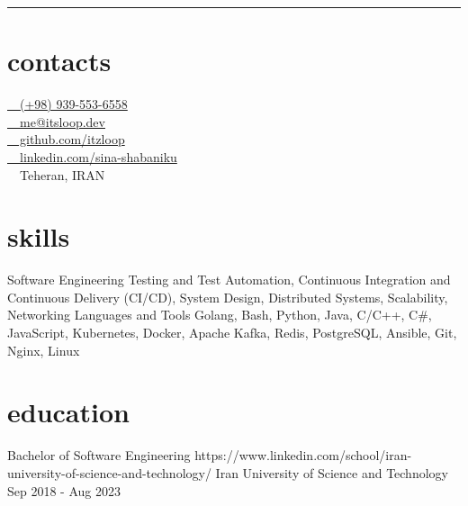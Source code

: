 \documentclass[a4paper,20pt]{article}
\begin{document}
\begin{center}
\end{center}
\vspace*{1pt}
\begin{center}
\end{center}
\rule{\textwidth}{1pt}
\vspace{20pt}
\begin{minipage}[t]{0.3\textwidth}
  \preparetopsec
  \section{contacts}
  {
    \href{tel:989395536558}{ \small~~(+98) 939-553-6558} \\ \vspace{6pt}  
    \href{mailto:me@itsloop.dev}{ \small~~me@itsloop.dev} \\ \vspace{6pt} 
    \href{https://github.com/itzloop}{ \small~~github.com/itzloop}\\ \vspace{6pt} 
    \href{https://linkedin.com/in/sina-shabaniku}{ \small~~linkedin.com/sina-shabaniku} \\ \vspace{6pt} 
     \small~~Teheran, IRAN
    \vspace*{14pt}
  }

  \preparenormalsec
  \section{skills}
  {
    \skill
      {Software Engineering}
      {Testing and Test Automation, Continuous Integration and Continuous Delivery (CI/CD), System Design, Distributed Systems, Scalability, Networking}
    \vspace*{10pt}
    \skill
      {Languages and Tools}
      {Golang, Bash, Python, Java, C/C++, C\#, JavaScript, Kubernetes, Docker, Apache Kafka, Redis, PostgreSQL, Ansible, Git, Nginx, Linux}
  
  }
  \preparenormalsec
  \section{education}
  {
    \edu
      {Bachelor of Software Engineering}
      {https://www.linkedin.com/school/iran-university-of-science-and-technology/}
      {Iran University of Science and Technology}
      {Sep 2018 - Aug 2023}
    \vspace*{10pt}

}
\end{minipage}
\end{document}
